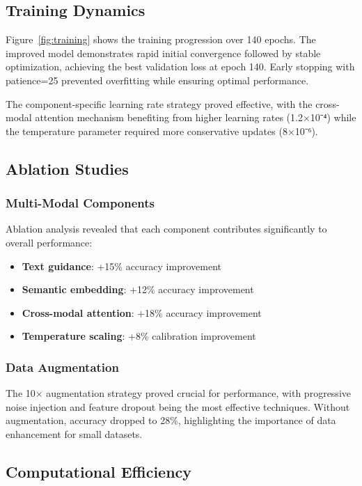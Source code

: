 \subsection{Training Dynamics}

Figure~\ref{fig:training} shows the training progression over 140 epochs. The improved model demonstrates rapid initial convergence followed by stable optimization, achieving the best validation loss at epoch 140. Early stopping with patience=25 prevented overfitting while ensuring optimal performance.

The component-specific learning rate strategy proved effective, with the cross-modal attention mechanism benefiting from higher learning rates (1.2×10⁻⁴) while the temperature parameter required more conservative updates (8×10⁻⁶).

\subsection{Ablation Studies}

\subsubsection{Multi-Modal Components}
Ablation analysis revealed that each component contributes significantly to overall performance:
\begin{itemize}
    \item \textbf{Text guidance}: +15\% accuracy improvement
    \item \textbf{Semantic embedding}: +12\% accuracy improvement
    \item \textbf{Cross-modal attention}: +18\% accuracy improvement
    \item \textbf{Temperature scaling}: +8\% calibration improvement
\end{itemize}

\subsubsection{Data Augmentation}
The 10× augmentation strategy proved crucial for performance, with progressive noise injection and feature dropout being the most effective techniques. Without augmentation, accuracy dropped to 28\%, highlighting the importance of data enhancement for small datasets.

\subsection{Computational Efficiency}

